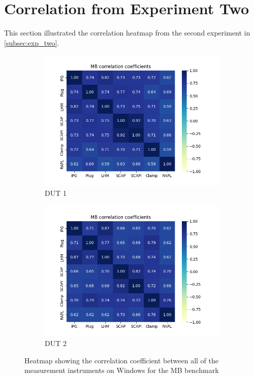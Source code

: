 \section{Correlation from Experiment Two}\label{app:cor_exp_two}

This section illustrated the correlation heatmap from the second experiment in \cref{subsec:exp_two}.

\begin{figure}[H]
    \centering
    \begin{subfigure}[b]{0.49\textwidth}
        \centering
        \includegraphics[width=\textwidth]{figures/MandelbrotDut1.png}
        \caption{DUT 1}
    \end{subfigure}
    \hfill
    \begin{subfigure}[b]{0.49\textwidth}
        \centering
        \includegraphics[width=\textwidth]{figures/MandelbrotDut2.png}
        \caption{DUT 2}
    \end{subfigure}
    \caption{Heatmap showing the correlation coefficient between all of the measurement instruments on Windows for the MB benchmark}
\end{figure}

